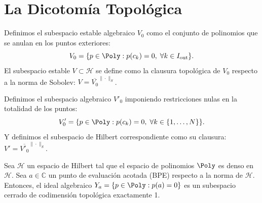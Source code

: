 \section{La Dicotomía Topológica}

\begin{defn}
	Definimos el subespacio estable algebraico $V_0$ como el conjunto de polinomios que se anulan en los puntos exteriores:
	\begin{equation}
		V_0 = \{p \in \Poly : p(c_k) = 0, \; \forall k \in I_{\mathrm{out}}\}.
	\end{equation}
	El subespacio estable $V \subset \mathcal{H}$ se define como la clausura topológica de $V_0$ respecto a la norma de Sobolev: $V = \overline{V_0}^{\|\cdot\|_S}$.
\end{defn}

\begin{defn}
	Definimos el subespacio algebraico $V'_0$ imponiendo restricciones nulas en la totalidad de los puntos:
	\begin{equation}
		V'_0 = \{p \in \Poly : p(c_k) = 0, \; \forall k \in \{1, \dots, N\}\}.
	\end{equation}
	Y definimos el subespacio de Hilbert correspondiente como su clausura: $V' = \overline{V'_0}^{\|\cdot\|_S}$.
\end{defn}

\begin{prop}
	Sea $\mathcal{H}$ un espacio de Hilbert tal que el espacio de polinomios $\Poly$ es denso en $\mathcal{H}$. Sea $a \in \mathbb{C}$ un punto de evaluación acotada (BPE) respecto a la norma de $\mathcal{H}$. Entonces, el ideal algebraico $Y_a = \{p \in \Poly : p(a) = 0\}$ es un subespacio cerrado de codimensión topológica exactamente 1.
\end{prop}

